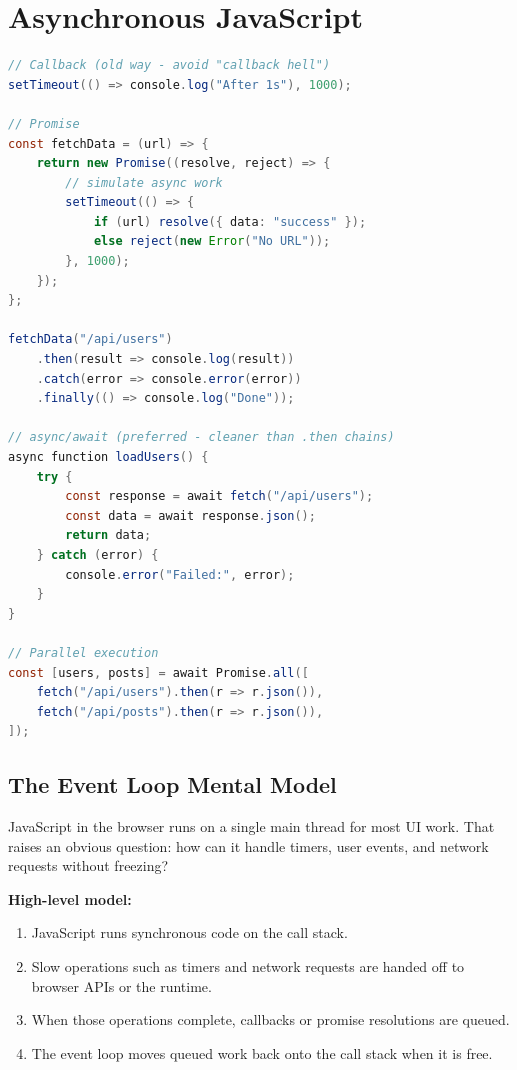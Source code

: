 \documentclass[12pt, a4paper, oneside]{book}
\begin{document}
\section{Asynchronous JavaScript}

\begin{lstlisting}[language=Java, caption={Promises and async/await}]
// Callback (old way - avoid "callback hell")
setTimeout(() => console.log("After 1s"), 1000);

// Promise
const fetchData = (url) => {
    return new Promise((resolve, reject) => {
        // simulate async work
        setTimeout(() => {
            if (url) resolve({ data: "success" });
            else reject(new Error("No URL"));
        }, 1000);
    });
};

fetchData("/api/users")
    .then(result => console.log(result))
    .catch(error => console.error(error))
    .finally(() => console.log("Done"));

// async/await (preferred - cleaner than .then chains)
async function loadUsers() {
    try {
        const response = await fetch("/api/users");
        const data = await response.json();
        return data;
    } catch (error) {
        console.error("Failed:", error);
    }
}

// Parallel execution
const [users, posts] = await Promise.all([
    fetch("/api/users").then(r => r.json()),
    fetch("/api/posts").then(r => r.json()),
]);
\end{lstlisting}

\subsection{The Event Loop Mental Model}

JavaScript in the browser runs on a single main thread for most UI work. That raises an obvious question: how can it handle timers, user events, and network requests without freezing?

\textbf{High-level model:}
\begin{enumerate}[leftmargin=2em]
    \item JavaScript runs synchronous code on the call stack.
    \item Slow operations such as timers and network requests are handed off to browser APIs or the runtime.
    \item When those operations complete, callbacks or promise resolutions are queued.
    \item The event loop moves queued work back onto the call stack when it is free.
\end{enumerate}
\end{document}
